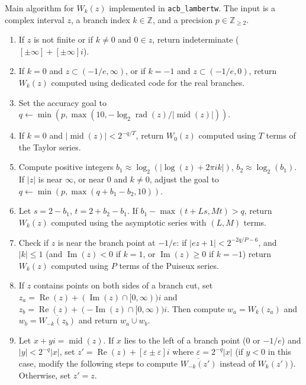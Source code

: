 \documentclass[11pt,a4paper]{article}
\begin{document}
\begin{algorithm}[h!]
\caption{Main algorithm for $W_k(z)$ implemented in \texttt{acb\_lambertw}. The input is a complex interval $z$, a branch index $k \in \mathbb{Z}$, and a precision $p \in \mathbb{Z}_{\ge 2}$.}

\begin{enumerate}
\setlength{\itemsep}{0pt}
\setlength{\parskip}{3pt}
\setlength{\parsep}{0pt}
\item If $z$ is not finite or if $k \ne 0$ and $0 \in z$, return indeterminate ($[\pm \infty] + [\pm \infty] i$).
\item \label{algrealstep} If $k = 0$ and $z \subset (-1/e,\infty)$, or if $k = -1$ and $z \subset (-1/e,0)$, return $W_k(z)$ computed using dedicated code for the real branches.
\item \label{algsetprec} Set the accuracy goal to $q \gets \min(p, \max(10, -\log_2 \operatorname{rad}(z) / |\operatorname{mid}(z)|))$.
\item \label{algpointtaylor} If $k = 0$ and $|\operatorname{mid}(z)| < 2^{-q/T}$, return $W_0(z)$ computed using $T$ terms of the Taylor series.
\item \label{algpointebits} Compute positive integers $b_1 \approx \log_2(|\log(z) + 2 \pi i k|)$, $b_2 \approx \log_2(b_1)$.
      If $|z|$ is near $\infty$, or near 0 and $k \ne 0$, adjust the goal to $q \gets \min(p, \max(q + b_1 - b_2, 10))$.
\item \label{algpointasymp} Let $s = 2-b_1$, $t = 2+b_2-b_1$. If $b_1 - \max(t+Ls, Mt) > q$, return $W_k(z)$ computed using the asymptotic series with $(L, M)$ terms.
\item \label{algpointpuiseux} Check if $z$ is near the branch point at $-1/e$: if
      $|ez+1| < 2^{-2q/P - 6}$, and $|k| \le 1$ (and $\operatorname{Im}(z) < 0$ if $k = 1$, or $\operatorname{Im}(z) \ge 0$ if $k = -1$)
      return $W_k(z)$ computed using $P$ terms of the Puiseux series.

\item \label{algpointunion} If $z$ contains points on both sides of a branch cut, set $z_a = \operatorname{Re}(z) + (\operatorname{Im}(z) \cap [0,\infty)) i$
and $z_b = \operatorname{Re}(z) + (-\operatorname{Im}(z) \cap [0,\infty)) i$.
Then compute $w_a = W_k(z_a)$ and $w_b = \overline{W_{-k}(z_b)}$ and return $w_a \cup w_b$.

\item Let $x+yi = \operatorname{mid}(z)$. If $x$ lies to the left of a branch point ($0$ or $-1/e$) and
    $|y| < 2^{-q} |x|$, set $z' = \operatorname{Re}(z) + [\varepsilon \pm \varepsilon] i$ where $\varepsilon = 2^{-q} |x|$
    (if $y < 0$ in this case, modify the following steps to compute
    $\overline{W_{-k}(z')}$ instead of $W_k(z')$).
    Otherwise, set $z' = z$.


\end{enumerate}
\end{algorithm}
\end{document}
